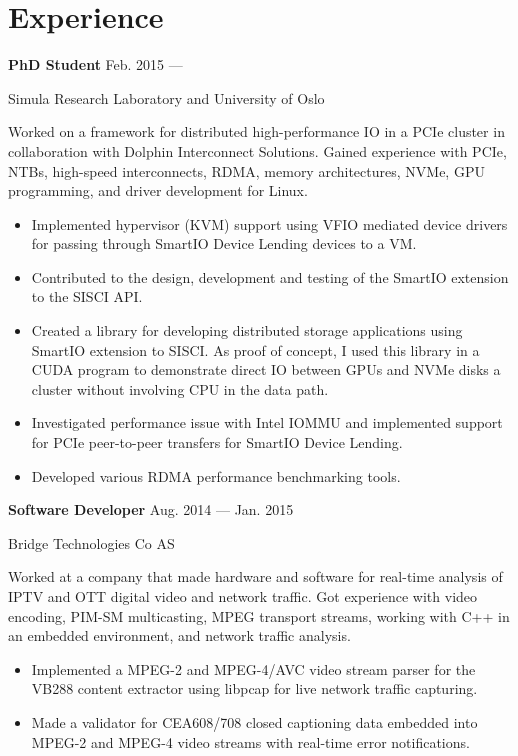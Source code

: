 \section{Experience}
\parbox[t][][t]{\linewidth}{
	\parbox{\linewidth}{\textbf{PhD Student}
		\hfill {{Feb. 2015 --- \phantom{Sep. 2018}}}}
		\smallbreak
	\parbox{\linewidth}{Simula Research Laboratory and University of Oslo}

	\bigskip
	Worked on a framework for distributed high-performance IO in a PCIe cluster in
	collaboration with Dolphin Interconnect Solutions. Gained
	experience with PCIe, NTBs, high-speed interconnects, RDMA, memory
	architectures, NVMe, GPU programming, and driver development for Linux.

	\bigskip
	\begin{itemize}
		\item{Implemented hypervisor (KVM) support using VFIO mediated device drivers
			for passing through SmartIO Device Lending devices to a VM.}\\[-.6em]
		\item{Contributed to the design, development and testing of the SmartIO
			extension to the SISCI API.}\\[-.6em]
		\item{Created a library for developing distributed storage
			applications using SmartIO extension to SISCI.
			As proof of concept, I used this library in a CUDA program to demonstrate direct
			IO between GPUs and NVMe disks a cluster without
			involving CPU in the data path.}\\[-.6em]
		\item{Investigated performance issue with Intel IOMMU and
			implemented support for PCIe peer-to-peer transfers for SmartIO Device Lending.}\\[-.6em]
		\item{Developed various RDMA performance benchmarking tools.}
	\end{itemize}
	\bigskip
	\bigskip
}

\parbox[t][][t]{\linewidth}{
	\parbox{\linewidth}{\textbf{Software Developer}
		\hfill {{Aug. 2014 --- Jan. 2015}}}
		\smallbreak
	\parbox{\linewidth}{Bridge Technologies Co AS}

	\bigskip
	Worked at a company that made hardware and software
	for real-time analysis of IPTV and OTT digital video and network
	traffic. Got experience with video encoding, PIM-SM multicasting, MPEG transport
	streams, working with C++ in an embedded environment, and
	network traffic analysis.

	\bigskip
	\begin{itemize}
		\item{Implemented a MPEG-2 and MPEG-4/AVC video stream parser for the
			VB288 content extractor using libpcap for live network
			traffic capturing.}\\[-.6em]
		\item{Made a validator for CEA608/708 closed captioning data
		embedded into MPEG-2 and MPEG-4 video streams with real-time
			error notifications.}
	\end{itemize}
	\bigskip
	\bigskip
}

